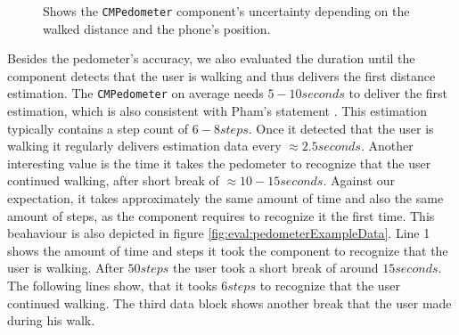 \begin{figure}
  \caption {Shows the \texttt{CMPedometer} component's uncertainty depending on the walked distance and the phone's position.}
  \label{fig:eval:pedometerNDF}
\end{figure}


Besides the pedometer's accuracy, we also evaluated the duration until the component detects that the user is walking and thus delivers the first distance estimation.
The \texttt{CMPedometer} on average needs $5 - 10 seconds$ to deliver the first estimation, which is also consistent with Pham's statement \cite{wwdc_2014}.
This estimation typically contains a step count of $6 - 8 steps$. Once it detected that the user is walking it regularly delivers estimation data every $\approx 2.5 seconds$.
Another interesting value is the time it takes the pedometer to recognize that the user continued walking, after short break of $\approx 10 - 15 seconds$.
Against our expectation, it takes approximately the same amount of time and also the same amount of steps, as the component requires to recognize it the first time.
This beahaviour is also depicted in figure \ref{fig:eval:pedometerExampleData}.
Line 1 shows the amount of time and steps it took the component to recognize that the user is walking.
After $50 steps$ the user took a short break of around $15 seconds$. The following lines show, that it tooks $6steps$ to recognize that the user continued walking.
The third data block shows another break that the user made during his walk.

